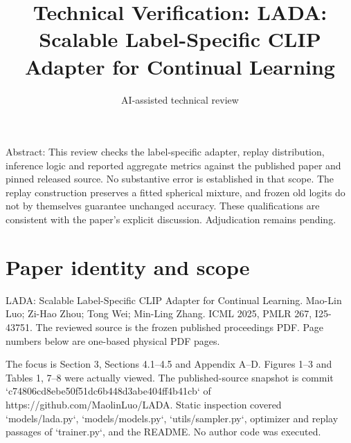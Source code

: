 \documentclass[10pt]{article}
\title{Technical Verification: LADA: Scalable Label-Specific CLIP Adapter for Continual Learning}
\author{AI-assisted technical review}
\date{}
\begin{document}
\maketitle
Abstract: This review checks the label-specific adapter, replay distribution, inference logic and reported aggregate metrics against the published paper and pinned released source. No substantive error is established in that scope. The replay construction preserves a fitted spherical mixture, and frozen old logits do not by themselves guarantee unchanged accuracy. These qualifications are consistent with the paper’s explicit discussion. Adjudication remains pending.\par
\section*{Paper identity and scope}
LADA: Scalable Label-Specific CLIP Adapter for Continual Learning. Mao-Lin Luo; Zi-Hao Zhou; Tong Wei; Min-Ling Zhang. ICML 2025, PMLR 267, I25-43751. The reviewed source is the frozen published proceedings PDF. Page numbers below are one-based physical PDF pages.\par
The focus is Section 3, Sections 4.1–4.5 and Appendix A–D. Figures 1–3 and Tables 1, 7–8 were actually viewed. The published-source snapshot is commit `c74806cd8ebe50f51dc6b448d3abe404ff4b41cb` of https://github.com/MaolinLuo/LADA. Static inspection covered `models/lada.py`, `models/models.py`, `utils/sampler.py`, optimizer and replay passages of `trainer.py`, and the README. No author code was executed.\par
\end{document}
